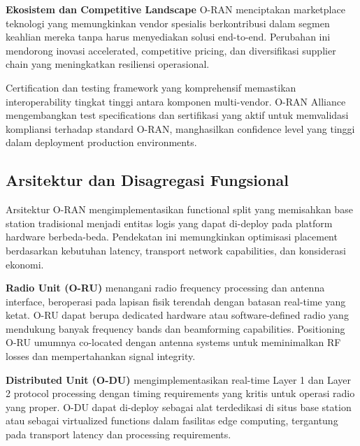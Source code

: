 \textbf{Ekosistem dan Competitive Landscape} O-RAN menciptakan marketplace teknologi yang memungkinkan vendor spesialis berkontribusi dalam segmen keahlian mereka tanpa harus menyediakan solusi end-to-end. Perubahan ini mendorong inovasi accelerated, competitive pricing, dan diversifikasi supplier chain yang meningkatkan resiliensi operasional.

Certification dan testing framework yang komprehensif memastikan interoperability tingkat tinggi antara komponen multi-vendor. O-RAN Alliance mengembangkan test specifications dan sertifikasi yang aktif untuk memvalidasi kompliansi terhadap standard O-RAN, manghasilkan confidence level yang tinggi dalam deployment production environments.

\subsection{Arsitektur dan Disagregasi Fungsional}

Arsitektur O-RAN mengimplementasikan functional split yang memisahkan base station tradisional menjadi entitas logis yang dapat di-deploy pada platform hardware berbeda-beda. Pendekatan ini memungkinkan optimisasi placement berdasarkan kebutuhan latency, transport network capabilities, dan konsiderasi ekonomi.


\textbf{Radio Unit (O-RU)} menangani radio frequency processing dan antenna interface, beroperasi pada lapisan fisik terendah dengan batasan real-time yang ketat. O-RU dapat berupa dedicated hardware atau software-defined radio yang mendukung banyak frequency bands dan beamforming capabilities. Positioning O-RU umumnya co-located dengan antenna systems untuk meminimalkan RF losses dan mempertahankan signal integrity.

\textbf{Distributed Unit (O-DU)} mengimplementasikan real-time Layer 1 dan Layer 2 protocol processing dengan timing requirements yang kritis untuk operasi radio yang proper. O-DU dapat di-deploy sebagai alat terdedikasi di situs base station atau sebagai virtualized functions dalam fasilitas edge computing, tergantung pada transport latency dan processing requirements.

